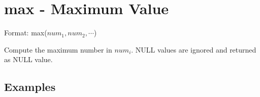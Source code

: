 
%

\section{max - Maximum Value\label{sect:max}}

Format: max($num_1,num_2,\cdots$)

Compute the maximum number in $num_i$. 
NULL values are ignored and returned as NULL value. 


\subsection*{Examples}


%

